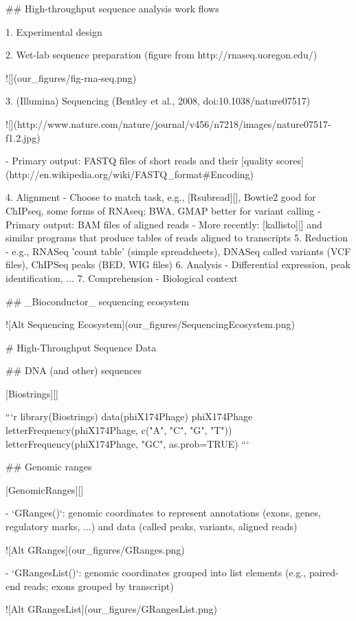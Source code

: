 ## High-throughput sequence analysis work flows

1. Experimental design

2. Wet-lab sequence preparation (figure from http://rnaseq.uoregon.edu/)

    ![](our_figures/fig-rna-seq.png)

3. (Illumina) Sequencing (Bentley et al., 2008,
   doi:10.1038/nature07517)

    ![](http://www.nature.com/nature/journal/v456/n7218/images/nature07517-f1.2.jpg)

    - Primary output: FASTQ files of short reads and their [quality
      scores](http://en.wikipedia.org/wiki/FASTQ_format#Encoding)

4. Alignment
    - Choose to match task, e.g., [Rsubread][], Bowtie2 good for ChIPseq,
      some forms of RNAseq; BWA, GMAP better for variant calling
    - Primary output: BAM files of aligned reads
    - More recently: [kallisto][] and similar programs that produce
      tables of reads aligned to transcripts
5. Reduction
    - e.g., RNASeq 'count table' (simple spreadsheets), DNASeq called
      variants (VCF files), ChIPSeq peaks (BED, WIG files)
6. Analysis
    - Differential expression, peak identification, ...
7. Comprehension
    - Biological context

## _Bioconductor_ sequencing ecosystem

![Alt Sequencing Ecosystem](our_figures/SequencingEcosystem.png)

# High-Throughput Sequence Data

## DNA (and other) sequences

[Biostrings][]

```{r}
library(Biostrings)
data(phiX174Phage)
phiX174Phage
letterFrequency(phiX174Phage, c("A", "C", "G", "T"))
letterFrequency(phiX174Phage, "GC", as.prob=TRUE)
```

## Genomic ranges

[GenomicRanges][]

- `GRanges()`: genomic coordinates to represent annotations (exons,
  genes, regulatory marks, ...) and data (called peaks, variants,
  aligned reads)

    ![Alt GRanges](our_figures/GRanges.png)

- `GRangesList()`: genomic coordinates grouped into list elements
  (e.g., paired-end reads; exons grouped by transcript)

    ![Alt GRangesList](our_figures/GRangesList.png)


